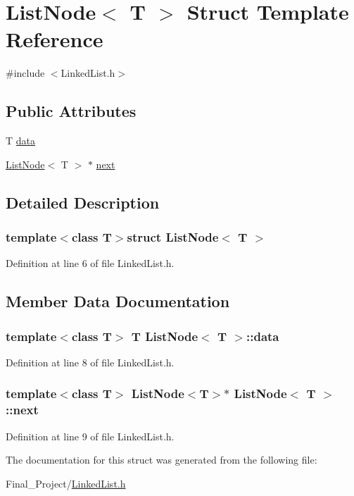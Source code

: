 \hypertarget{structListNode}{\section{List\-Node$<$ T $>$ Struct Template Reference}
\label{structListNode}
}


{\ttfamily \#include $<$Linked\-List.\-h$>$}

\subsection*{Public Attributes}
\begin{DoxyCompactItemize}
\item 
T \hyperlink{structListNode_a935e06f21b246fb3a0987dd3f9d28528}{data}
\item 
\hyperlink{structListNode}{List\-Node}$<$ T $>$ $\ast$ \hyperlink{structListNode_a97909c9598053ffd24b77ec715f745f1}{next}
\end{DoxyCompactItemize}


\subsection{Detailed Description}
\subsubsection*{template$<$class T$>$struct List\-Node$<$ T $>$}



Definition at line 6 of file Linked\-List.\-h.



\subsection{Member Data Documentation}
\hypertarget{structListNode_a935e06f21b246fb3a0987dd3f9d28528}{
\subsubsection[{data}]{\setlength{\rightskip}{0pt plus 5cm}template$<$class T$>$ T {\bf List\-Node}$<$ T $>$\-::data}}\label{structListNode_a935e06f21b246fb3a0987dd3f9d28528}


Definition at line 8 of file Linked\-List.\-h.

\hypertarget{structListNode_a97909c9598053ffd24b77ec715f745f1}{
\subsubsection[{next}]{\setlength{\rightskip}{0pt plus 5cm}template$<$class T$>$ {\bf List\-Node}$<$T$>$$\ast$ {\bf List\-Node}$<$ T $>$\-::next}}\label{structListNode_a97909c9598053ffd24b77ec715f745f1}


Definition at line 9 of file Linked\-List.\-h.



The documentation for this struct was generated from the following file\-:\begin{DoxyCompactItemize}
\item 
Final\-\_\-\-Project/\hyperlink{LinkedList_8h}{Linked\-List.\-h}\end{DoxyCompactItemize}
